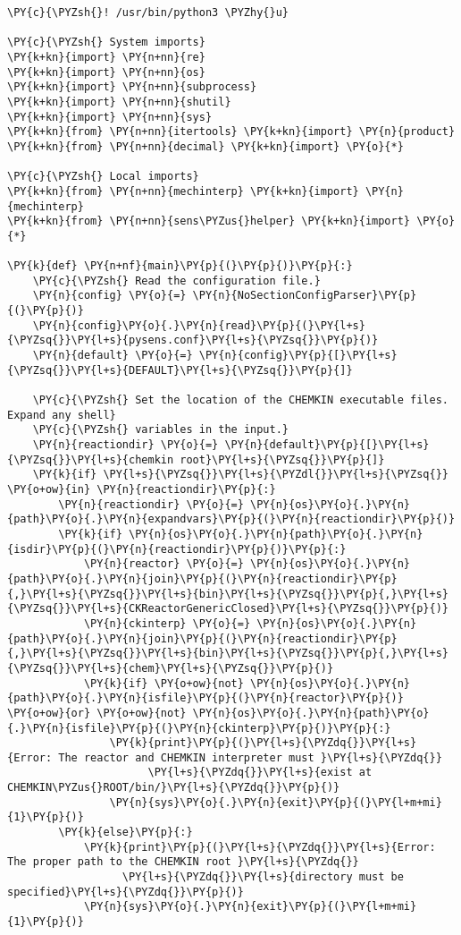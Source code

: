 \begin{Verbatim}[commandchars=\\\{\}]
\PY{c}{\PYZsh{}! /usr/bin/python3 \PYZhy{}u}

\PY{c}{\PYZsh{} System imports}
\PY{k+kn}{import} \PY{n+nn}{re}
\PY{k+kn}{import} \PY{n+nn}{os}
\PY{k+kn}{import} \PY{n+nn}{subprocess}
\PY{k+kn}{import} \PY{n+nn}{shutil}
\PY{k+kn}{import} \PY{n+nn}{sys}
\PY{k+kn}{from} \PY{n+nn}{itertools} \PY{k+kn}{import} \PY{n}{product}
\PY{k+kn}{from} \PY{n+nn}{decimal} \PY{k+kn}{import} \PY{o}{*}

\PY{c}{\PYZsh{} Local imports}
\PY{k+kn}{from} \PY{n+nn}{mechinterp} \PY{k+kn}{import} \PY{n}{mechinterp}
\PY{k+kn}{from} \PY{n+nn}{sens\PYZus{}helper} \PY{k+kn}{import} \PY{o}{*}

\PY{k}{def} \PY{n+nf}{main}\PY{p}{(}\PY{p}{)}\PY{p}{:}
    \PY{c}{\PYZsh{} Read the configuration file.}
    \PY{n}{config} \PY{o}{=} \PY{n}{NoSectionConfigParser}\PY{p}{(}\PY{p}{)}
    \PY{n}{config}\PY{o}{.}\PY{n}{read}\PY{p}{(}\PY{l+s}{\PYZsq{}}\PY{l+s}{pysens.conf}\PY{l+s}{\PYZsq{}}\PY{p}{)}
    \PY{n}{default} \PY{o}{=} \PY{n}{config}\PY{p}{[}\PY{l+s}{\PYZsq{}}\PY{l+s}{DEFAULT}\PY{l+s}{\PYZsq{}}\PY{p}{]}

    \PY{c}{\PYZsh{} Set the location of the CHEMKIN executable files. Expand any shell}
    \PY{c}{\PYZsh{} variables in the input.}
    \PY{n}{reactiondir} \PY{o}{=} \PY{n}{default}\PY{p}{[}\PY{l+s}{\PYZsq{}}\PY{l+s}{chemkin root}\PY{l+s}{\PYZsq{}}\PY{p}{]}
    \PY{k}{if} \PY{l+s}{\PYZsq{}}\PY{l+s}{\PYZdl{}}\PY{l+s}{\PYZsq{}} \PY{o+ow}{in} \PY{n}{reactiondir}\PY{p}{:}
        \PY{n}{reactiondir} \PY{o}{=} \PY{n}{os}\PY{o}{.}\PY{n}{path}\PY{o}{.}\PY{n}{expandvars}\PY{p}{(}\PY{n}{reactiondir}\PY{p}{)}
        \PY{k}{if} \PY{n}{os}\PY{o}{.}\PY{n}{path}\PY{o}{.}\PY{n}{isdir}\PY{p}{(}\PY{n}{reactiondir}\PY{p}{)}\PY{p}{:}
            \PY{n}{reactor} \PY{o}{=} \PY{n}{os}\PY{o}{.}\PY{n}{path}\PY{o}{.}\PY{n}{join}\PY{p}{(}\PY{n}{reactiondir}\PY{p}{,}\PY{l+s}{\PYZsq{}}\PY{l+s}{bin}\PY{l+s}{\PYZsq{}}\PY{p}{,}\PY{l+s}{\PYZsq{}}\PY{l+s}{CKReactorGenericClosed}\PY{l+s}{\PYZsq{}}\PY{p}{)}
            \PY{n}{ckinterp} \PY{o}{=} \PY{n}{os}\PY{o}{.}\PY{n}{path}\PY{o}{.}\PY{n}{join}\PY{p}{(}\PY{n}{reactiondir}\PY{p}{,}\PY{l+s}{\PYZsq{}}\PY{l+s}{bin}\PY{l+s}{\PYZsq{}}\PY{p}{,}\PY{l+s}{\PYZsq{}}\PY{l+s}{chem}\PY{l+s}{\PYZsq{}}\PY{p}{)}
            \PY{k}{if} \PY{o+ow}{not} \PY{n}{os}\PY{o}{.}\PY{n}{path}\PY{o}{.}\PY{n}{isfile}\PY{p}{(}\PY{n}{reactor}\PY{p}{)} \PY{o+ow}{or} \PY{o+ow}{not} \PY{n}{os}\PY{o}{.}\PY{n}{path}\PY{o}{.}\PY{n}{isfile}\PY{p}{(}\PY{n}{ckinterp}\PY{p}{)}\PY{p}{:}
                \PY{k}{print}\PY{p}{(}\PY{l+s}{\PYZdq{}}\PY{l+s}{Error: The reactor and CHEMKIN interpreter must }\PY{l+s}{\PYZdq{}}
                      \PY{l+s}{\PYZdq{}}\PY{l+s}{exist at CHEMKIN\PYZus{}ROOT/bin/}\PY{l+s}{\PYZdq{}}\PY{p}{)}
                \PY{n}{sys}\PY{o}{.}\PY{n}{exit}\PY{p}{(}\PY{l+m+mi}{1}\PY{p}{)}
        \PY{k}{else}\PY{p}{:}
            \PY{k}{print}\PY{p}{(}\PY{l+s}{\PYZdq{}}\PY{l+s}{Error: The proper path to the CHEMKIN root }\PY{l+s}{\PYZdq{}}
                  \PY{l+s}{\PYZdq{}}\PY{l+s}{directory must be specified}\PY{l+s}{\PYZdq{}}\PY{p}{)}
            \PY{n}{sys}\PY{o}{.}\PY{n}{exit}\PY{p}{(}\PY{l+m+mi}{1}\PY{p}{)}


\end{Verbatim}
